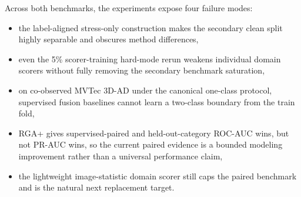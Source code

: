\documentclass[10pt,conference]{IEEEtran}
\newcommand{\methodplus}{RGA+}
\begin{document}

Across both benchmarks, the experiments expose four failure modes:
\begin{itemize}
  \item the label-aligned stress-only construction makes the secondary clean
  split highly separable and obscures method differences,
  \item even the 5\% scorer-training hard-mode rerun weakens individual domain
  scorers without fully removing the secondary benchmark saturation,
  \item on co-observed MVTec 3D-AD under the canonical one-class protocol,
  supervised fusion baselines cannot learn a two-class boundary from the train
  fold,
  \item \methodplus{} gives supervised-paired and held-out-category ROC-AUC
  wins, but not PR-AUC wins, so the current paired evidence is a bounded
  modeling improvement rather than a universal performance claim,
  \item the lightweight image-statistic domain scorer still caps the paired
  benchmark and is the natural next replacement target.
\end{itemize}
\end{document}

